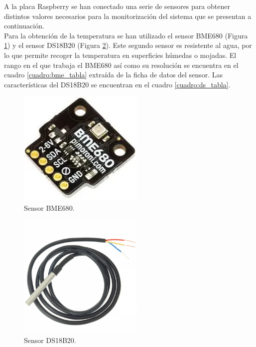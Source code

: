 A la placa Raspberry se han conectado una serie de sensores para obtener distintos valores necesarios para la monitorización del sistema que se presentan a continuación.\\

Para la obtención de la temperatura se han utilizado el sensor BME680 (Figura \ref{fig:bme_of}) y el sensor DS18B20 (Figura \ref{fig:ds_of}). Este segundo sensor es resistente al agua, por lo que permite recoger la temperatura en superficies húmedas o mojadas. El rango en el que trabaja el BME680 así como su resolución se encuentra en el cuadro \ref{cuadro:bme_tabla} extraída de la ficha de datos del sensor. Las características del DS18B20 se encuentran en el cuadro \ref{cuadro:ds_tabla}.\\
\begin{figure} [h!]
  \begin{center}
    \includegraphics[width=6cm]{figs/bme_of}
  \end{center}
  \caption{Sensor BME680.}
  \label{fig:bme_of}
\end{figure}

\begin{figure} [h!]
  \begin{center}
    \includegraphics[width=6cm]{figs/ds_of}
  \end{center}
  \caption{Sensor DS18B20.}
  \label{fig:ds_of}
\end{figure}

